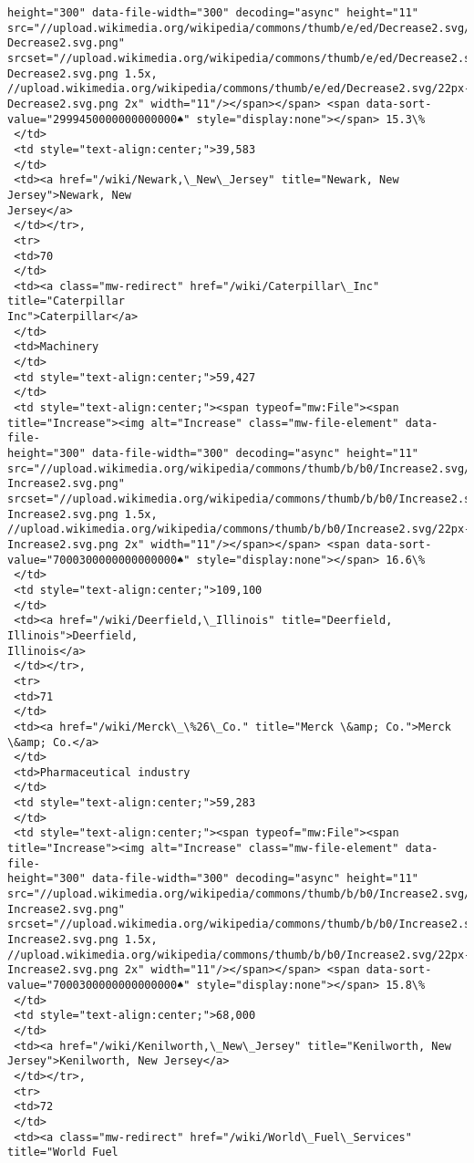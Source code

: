 \documentclass[11pt]{article}
\begin{document}
\begin{tcolorbox}[breakable, size=fbox, boxrule=.5pt, pad at break*=1mm, opacityfill=0]
\begin{Verbatim}[commandchars=\\\{\}]
height="300" data-file-width="300" decoding="async" height="11"
src="//upload.wikimedia.org/wikipedia/commons/thumb/e/ed/Decrease2.svg/11px-
Decrease2.svg.png"
srcset="//upload.wikimedia.org/wikipedia/commons/thumb/e/ed/Decrease2.svg/17px-
Decrease2.svg.png 1.5x,
//upload.wikimedia.org/wikipedia/commons/thumb/e/ed/Decrease2.svg/22px-
Decrease2.svg.png 2x" width="11"/></span></span> <span data-sort-
value="2999450000000000000♠" style="display:none"></span> 15.3\%
 </td>
 <td style="text-align:center;">39,583
 </td>
 <td><a href="/wiki/Newark,\_New\_Jersey" title="Newark, New Jersey">Newark, New
Jersey</a>
 </td></tr>,
 <tr>
 <td>70
 </td>
 <td><a class="mw-redirect" href="/wiki/Caterpillar\_Inc" title="Caterpillar
Inc">Caterpillar</a>
 </td>
 <td>Machinery
 </td>
 <td style="text-align:center;">59,427
 </td>
 <td style="text-align:center;"><span typeof="mw:File"><span
title="Increase"><img alt="Increase" class="mw-file-element" data-file-
height="300" data-file-width="300" decoding="async" height="11"
src="//upload.wikimedia.org/wikipedia/commons/thumb/b/b0/Increase2.svg/11px-
Increase2.svg.png"
srcset="//upload.wikimedia.org/wikipedia/commons/thumb/b/b0/Increase2.svg/17px-
Increase2.svg.png 1.5x,
//upload.wikimedia.org/wikipedia/commons/thumb/b/b0/Increase2.svg/22px-
Increase2.svg.png 2x" width="11"/></span></span> <span data-sort-
value="7000300000000000000♠" style="display:none"></span> 16.6\%
 </td>
 <td style="text-align:center;">109,100
 </td>
 <td><a href="/wiki/Deerfield,\_Illinois" title="Deerfield, Illinois">Deerfield,
Illinois</a>
 </td></tr>,
 <tr>
 <td>71
 </td>
 <td><a href="/wiki/Merck\_\%26\_Co." title="Merck \&amp; Co.">Merck \&amp; Co.</a>
 </td>
 <td>Pharmaceutical industry
 </td>
 <td style="text-align:center;">59,283
 </td>
 <td style="text-align:center;"><span typeof="mw:File"><span
title="Increase"><img alt="Increase" class="mw-file-element" data-file-
height="300" data-file-width="300" decoding="async" height="11"
src="//upload.wikimedia.org/wikipedia/commons/thumb/b/b0/Increase2.svg/11px-
Increase2.svg.png"
srcset="//upload.wikimedia.org/wikipedia/commons/thumb/b/b0/Increase2.svg/17px-
Increase2.svg.png 1.5x,
//upload.wikimedia.org/wikipedia/commons/thumb/b/b0/Increase2.svg/22px-
Increase2.svg.png 2x" width="11"/></span></span> <span data-sort-
value="7000300000000000000♠" style="display:none"></span> 15.8\%
 </td>
 <td style="text-align:center;">68,000
 </td>
 <td><a href="/wiki/Kenilworth,\_New\_Jersey" title="Kenilworth, New
Jersey">Kenilworth, New Jersey</a>
 </td></tr>,
 <tr>
 <td>72
 </td>
 <td><a class="mw-redirect" href="/wiki/World\_Fuel\_Services" title="World Fuel

\end{Verbatim}
\end{tcolorbox}
\end{document}
